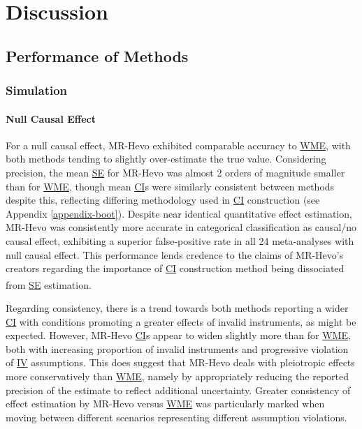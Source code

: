 \documentclass[
]{article}
\begin{document}
\section{Discussion}\label{discussion}

\subsection{Performance of Methods}\label{performance-of-methods}

\subsubsection{Simulation}\label{simulation}

\paragraph{Null Causal Effect}\label{null-causal-effect}

\leavevmode\newline For a null causal effect, MR-Hevo exhibited comparable accuracy to \hyperref[acronyms_WME]{WME}, with both methods tending to slightly over-estimate the true value. Considering precision, the mean \hyperref[acronyms_SE]{SE} for MR-Hevo was almost 2 orders of magnitude smaller than for \hyperref[acronyms_WME]{WME}, though mean \hyperref[acronyms_CI]{CI}s were similarly consistent between methods despite this, reflecting differing methodology used in \hyperref[acronyms_CI]{CI} construction (see Appendix \ref{appendix-boot}). Despite near identical quantitative effect estimation, MR-Hevo was consistently more accurate in categorical classification as causal/no causal effect, exhibiting a superior false-positive rate in all 24 meta-analyses with null causal effect. This performance lends credence to the claims of MR-Hevo's creators regarding the importance of \hyperref[acronyms_CI]{CI} construction method being dissociated from \hyperref[acronyms_SE]{SE} estimation\textsuperscript{}.

Regarding consistency, there is a trend towards both methods reporting a wider \hyperref[acronyms_CI]{CI} with conditions promoting a greater effects of invalid instruments, as might be expected. However, MR-Hevo \hyperref[acronyms_CI]{CI}s appear to widen slightly more than for \hyperref[acronyms_WME]{WME}, both with increasing proportion of invalid instruments and progressive violation of \hyperref[acronyms_IV]{IV} assumptions. This does suggest that MR-Hevo deals with pleiotropic effects more conservatively than \hyperref[acronyms_WME]{WME}, namely by appropriately reducing the reported precision of the estimate to reflect additional uncertainty. Greater consistency of effect estimation by MR-Hevo versus \hyperref[acronyms_WME]{WME} was particularly marked when moving between different scenarios representing different assumption violations.
\end{document}
